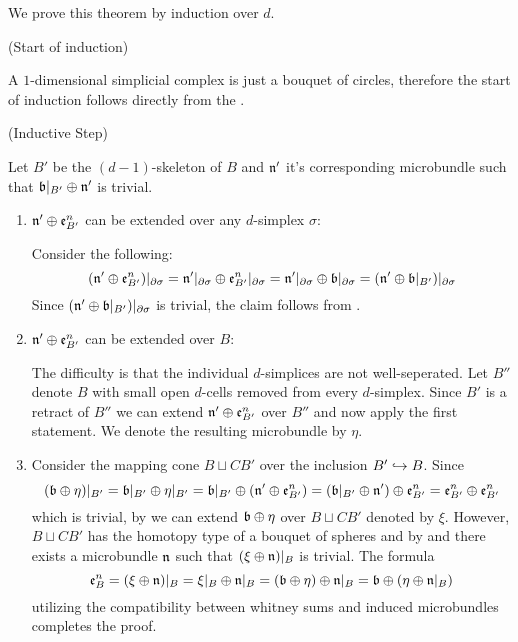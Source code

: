 \begin{myproof}
    We prove this theorem by induction over $d$.

    (Start of induction)

    A $1$-dimensional simplicial complex is just a bouquet of circles, therefore
    the start of induction follows directly from the .   

    (Inductive Step)

    Let $B'$ be the $(d - 1)$-skeleton of $B$ and $\mathfrak{n}'$ it's corresponding microbundle
    such that $\mathfrak{b}\vert_{B'} \oplus \mathfrak{n}'$ is trivial.

    \begin{enumerate}
        \item $\mathfrak{n}' \oplus \mathfrak{e}^n_{B'}$ can be extended over any $d$-simplex $\sigma$:

        Consider the following:
        \[
            (\mathfrak{n}' \oplus \mathfrak{e}^n_{B'})\vert_{\partial\sigma}
            = \mathfrak{n}'\vert_{\partial\sigma} \oplus \mathfrak{e}^n_{B'}\vert_{\partial\sigma}
            = \mathfrak{n}'\vert_{\partial\sigma} \oplus \mathfrak{b}\vert_{\partial\sigma}
            = (\mathfrak{n}' \oplus \mathfrak{b}\vert_{B'})\vert_{\partial\sigma}
        \]
        Since $(\mathfrak{n}' \oplus \mathfrak{b}\vert_{B'})\vert_{\partial\sigma}$ is trivial, the claim follows from .

        \item $\mathfrak{n}' \oplus \mathfrak{e}^n_{B'}$ can be extended over $B$:

        The difficulty is that the individual $d$-simplices are not well-seperated.
        Let $B''$ denote $B$ with small open $d$-cells removed from every $d$-simplex.
        Since $B'$ is a retract of $B''$ we can extend $\mathfrak{n}' \oplus \mathfrak{e}^n_{B'}$ over $B''$ and now apply the first statement.
        We denote the resulting microbundle by $\eta$.

        \item
        Consider the mapping cone $B \sqcup CB'$ over the inclusion $B' \hookrightarrow{} B$.
        Since
        \[
            (\mathfrak{b} \oplus \eta)\vert_{B'}
            = \mathfrak{b}\vert_{B'} \oplus \eta\vert_{B'}
            = \mathfrak{b}\vert_{B'} \oplus (\mathfrak{n}' \oplus \mathfrak{e}^n_{B'})
            = (\mathfrak{b}\vert_{B'} \oplus \mathfrak{n}') \oplus \mathfrak{e}^n_{B'}
            = \mathfrak{e}^n_{B'} \oplus \mathfrak{e}^n_{B'}
        \]
        which is trivial, by  we can extend $\mathfrak{b} \oplus \eta$ over $B \sqcup CB'$ denoted by $\xi$.
        However, $B \sqcup CB'$ has the homotopy type of a bouquet of spheres and by  and  there exists a microbundle $\mathfrak{n}$ such that $(\xi \oplus \mathfrak{n})\vert_{B}$ is trivial.
        The formula
        \[
            \mathfrak{e}^n_{B}
            = (\xi \oplus \mathfrak{n})\vert_{B}
            = \xi\vert_{B} \oplus \mathfrak{n}\vert_{B}
            = (\mathfrak{b} \oplus \eta) \oplus \mathfrak{n}\vert_{B}
            = \mathfrak{b} \oplus (\eta \oplus \mathfrak{n}\vert_{B})
        \]
        utilizing the compatibility between whitney sums and induced microbundles completes the proof.
    \end{enumerate}
\end{myproof}